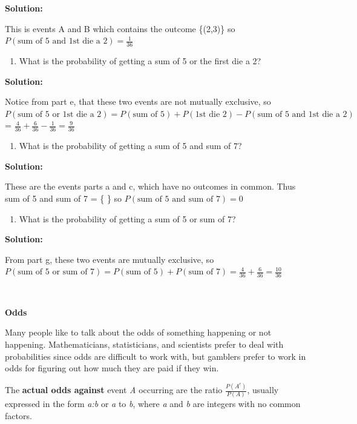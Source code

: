 \documentclass[
]{book}
\providecommand{\tightlist}{%
  \setlength{\itemsep}{0pt}\setlength{\parskip}{0pt}}
\begin{document}
\textbf{Solution:}

This is events A and B which contains the outcome \{(2,3)\} so \(P(\text{sum of 5 and 1st die a 2})=\frac{1}{36}\)

\begin{enumerate}
\def\labelenumi{\alph{enumi}.}
\setcounter{enumi}{5}
\tightlist
\item
  What is the probability of getting a sum of 5 or the first die a 2?
\end{enumerate}

\textbf{Solution:}

Notice from part e, that these two events are not mutually exclusive, so \(P(\text{sum of 5 or 1st die a 2})=P(\text{sum of 5})+P(\text{1st die 2})-P(\text{sum of 5 and 1st die a 2})\) = \(\frac{4}{36}+\frac{6}{36}-\frac{1}{36}=\frac{9}{36}\)

\begin{enumerate}
\def\labelenumi{\alph{enumi}.}
\setcounter{enumi}{6}
\tightlist
\item
  What is the probability of getting a sum of 5 and sum of 7?
\end{enumerate}

\textbf{Solution:}

These are the events parts a and c, which have no outcomes in common. Thus sum of 5 and sum of 7 = \{ \} so \(P(\text{sum of 5 and sum of 7})=0\)

\begin{enumerate}
\def\labelenumi{\alph{enumi}.}
\setcounter{enumi}{7}
\tightlist
\item
  What is the probability of getting a sum of 5 or sum of 7?
\end{enumerate}

\textbf{Solution:}

From part g, these two events are mutually exclusive, so \(P(\text{sum of 5 or sum of 7})=P(\text{sum of 5})+P(\text{sum of 7})=\frac{4}{36}+\frac{6}{36}=\frac{10}{36}\)

\textbf{\\
}

\textbf{Odds}

Many people like to talk about the odds of something happening or not happening. Mathematicians, statisticians, and scientists prefer to deal with probabilities since odds are difficult to work with, but gamblers prefer to work in odds for figuring out how much they are paid if they win.

The \textbf{actual odds against} event \emph{A} occurring are the ratio \(\frac{P(A^c)}{P(A)}\), usually expressed in the form \emph{a:b} or \emph{a} to \emph{b}, where \emph{a} and \emph{b} are integers with no common factors.
\end{document}
